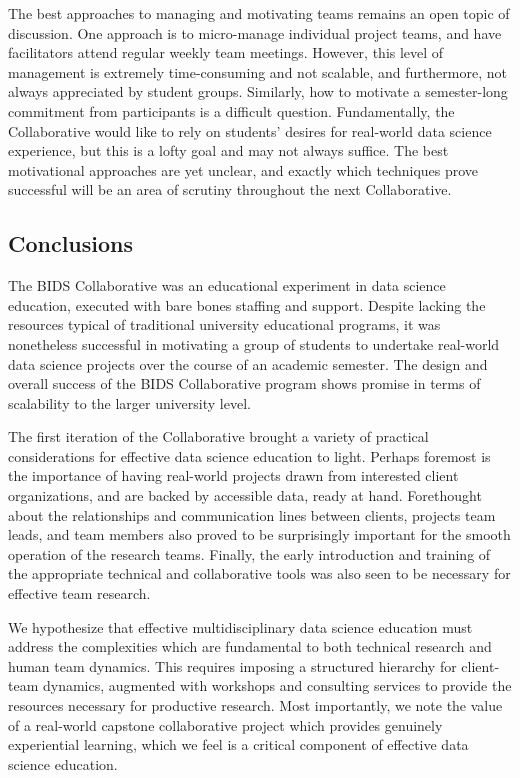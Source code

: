 \documentclass[12pt]{article}
\begin{document}
The best approaches to managing and motivating teams remains an open topic of discussion.  One approach is to micro-manage individual project teams, and have facilitators attend regular weekly team meetings.  However, this level of management is extremely time-consuming and not scalable, and furthermore, not always appreciated by student groups.  Similarly, how to motivate a semester-long commitment from participants is a difficult question.  Fundamentally, the Collaborative would like to rely on students' desires for real-world data science experience, but this is a lofty goal and may not always suffice.  The best motivational approaches are yet unclear, and exactly which techniques prove successful will be an area of scrutiny throughout the next Collaborative.

\subsection{Conclusions}

The BIDS Collaborative was an educational experiment in data science education, executed with bare bones staffing and support. Despite lacking the resources typical of traditional university educational programs, it was nonetheless successful in motivating a group of students to undertake real-world data science projects over the course of an academic semester.  The design and overall success of the BIDS Collaborative program shows promise in terms of scalability to the larger university level.

The first iteration of the Collaborative brought a variety of practical considerations for effective data science education to light.  Perhaps foremost is the importance of having real-world projects drawn from interested client organizations, and are backed by accessible data, ready at hand.  Forethought about the relationships and communication lines between clients, projects team leads, and team members also proved to be surprisingly important for the smooth operation of the research teams.  Finally, the early introduction and training of the appropriate technical and collaborative tools was also seen to be necessary for effective team research.

We hypothesize that effective multidisciplinary data science education must address the complexities which are fundamental to both technical research and human team dynamics. This requires imposing a structured hierarchy for client-team dynamics, augmented with workshops and consulting services to provide the resources necessary for productive research.  Most importantly, we note the value of a real-world capstone collaborative project which provides genuinely experiential learning, which we feel is a critical component of effective data science education.
\end{document}
